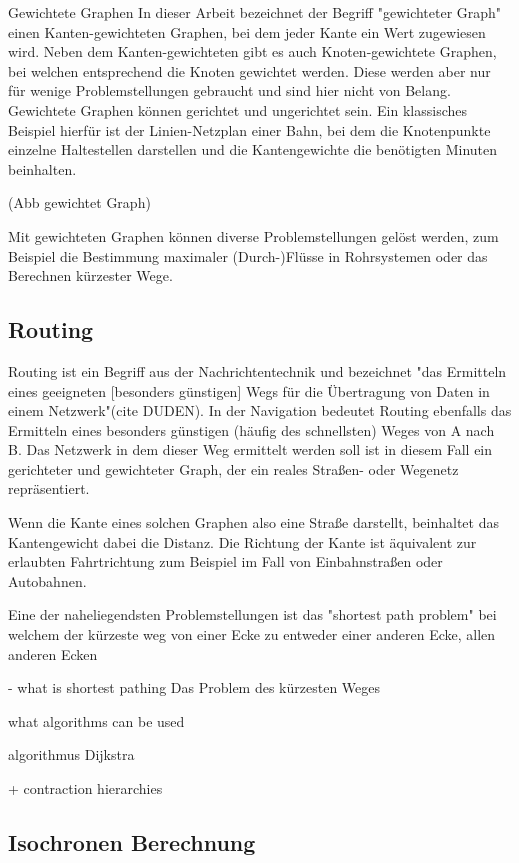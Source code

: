 \documentclass[10pt,a4paper]{article}
\begin{document}
Gewichtete Graphen
In dieser Arbeit bezeichnet der Begriff "gewichteter Graph" einen Kanten-gewichteten Graphen, bei dem jeder Kante ein Wert zugewiesen wird. Neben dem Kanten-gewichteten gibt es auch Knoten-gewichtete Graphen, bei welchen entsprechend die Knoten gewichtet werden. Diese werden aber nur für wenige Problemstellungen gebraucht und sind hier nicht von Belang. Gewichtete Graphen können gerichtet und ungerichtet sein. Ein klassisches Beispiel hierfür ist der Linien-Netzplan einer Bahn, bei dem die Knotenpunkte einzelne Haltestellen darstellen und die Kantengewichte die benötigten Minuten beinhalten.

(Abb gewichtet Graph)

Mit gewichteten Graphen können diverse Problemstellungen gelöst werden, zum Beispiel die Bestimmung maximaler (Durch-)Flüsse in Rohrsystemen oder das Berechnen kürzester Wege.

\subsection{Routing}

Routing ist ein Begriff aus der Nachrichtentechnik und bezeichnet "das Ermitteln eines geeigneten [besonders günstigen] Wegs für die Übertragung von Daten in einem Netzwerk"(cite DUDEN). In der Navigation bedeutet Routing ebenfalls das Ermitteln eines besonders günstigen (häufig des schnellsten) Weges von A nach B. Das Netzwerk in dem dieser Weg ermittelt werden soll ist in diesem Fall ein gerichteter und gewichteter Graph, der ein reales Straßen- oder Wegenetz repräsentiert.

Wenn die Kante eines solchen Graphen also eine Straße darstellt, beinhaltet das Kantengewicht dabei die Distanz. Die Richtung der Kante ist äquivalent zur erlaubten Fahrtrichtung zum Beispiel im Fall von Einbahnstraßen oder Autobahnen.

Eine der naheliegendsten Problemstellungen ist das "shortest path problem" bei welchem der kürzeste weg von einer Ecke zu entweder einer anderen Ecke, allen anderen Ecken 

- what is shortest pathing
Das Problem des kürzesten Weges 


what algorithms can be used

algorithmus Dijkstra 

+ contraction hierarchies

\subsection{Isochronen Berechnung}
\end{document}
